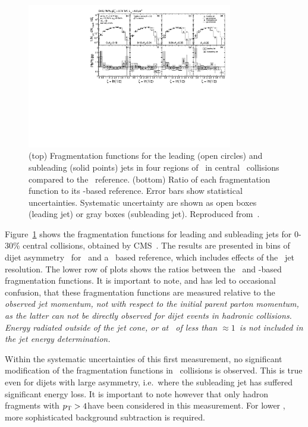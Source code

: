 \begin{figure}[!ht]
\begin{center}
\includegraphics[width=0.8\textwidth]{jetfigures/xsi_div_both_effv9_l100s40_0to12_dphi20eta20dr3pt4id1_cwt_ppDiv_gray.pdf}
\caption{(top) Fragmentation functions for the leading (open circles) and subleading (solid points) 
jets in four regions of \AJ\ in central \PbPb\ collisions compared to the \pp\ reference.
(bottom) Ratio of each fragmentation function to its \pp-based reference.
Error bars show statistical uncertainties. Systematic uncertainty are 
shown as open boxes (leading jet) or gray boxes (subleading jet).
Reproduced from~\cite{Chatrchyan:2012gw}.
}

\label{fig:GR:CMS_jetFF}
\end{center}
\end{figure}
Figure~\ref{fig:GR:CMS_jetFF} shows the fragmentation functions 
for leading and subleading jets for 0-30\% central collisions, obtained
by CMS~\cite{Chatrchyan:2012gw}. The results are presented in bins of 
dijet asymmetry \AJ\ for \PbPb\ and a \pp\ based reference,
which includes effects of the \PbPb\ jet resolution.
The lower row of plots shows the ratios between the \PbPb\
and \pp-based fragmentation functions. It is important to note, and has 
led to occasional confusion, that these fragmentation functions are 
measured relative to the \em observed \em jet momentum, not with respect
to the initial parent parton momentum, as the latter can not be directly observed
for dijet events in hadronic collisions.
Energy radiated outside of the jet cone, or at \pT\ of less than $\approx 1$\GeVc\
is not included in the jet energy determination.

Within the systematic uncertainties of this first measurement, no significant modification of
the fragmentation functions in \PbPb\ collisions is observed. This is true even for
dijets with large asymmetry, i.e.\ where the subleading jet has suffered significant
energy loss. It is important to note however that only hadron fragments 
with $\mbox{$p_{\mathrm{T}}$} > 4$\GeVc have been considered in this measurement. For lower \pT, more
sophisticated background subtraction is required. 


